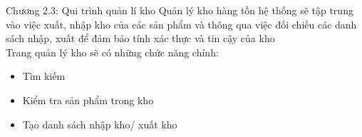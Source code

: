\documentclass{beamer}
\begin{document}
\begin{frame}{Chương 2.3: Qui trình quản lí kho}
    Quản lý kho hàng tồn hệ thống sẽ tập trung vào việc xuất, nhập kho của các sản phẩm và thông qua việc đối chiếu các danh sách nhập, xuất để đảm bảo tính xác thực và tin cậy của kho\\
    
    Trang quản lý kho sẽ có những chức năng chính:
    \begin{itemize}
        \item Tìm kiếm 
        \item Kiểm tra sản phẩm trong kho
        \item Tạo danh sách nhập kho/ xuất kho
    \end{itemize}
\end{frame}
\end{document}
